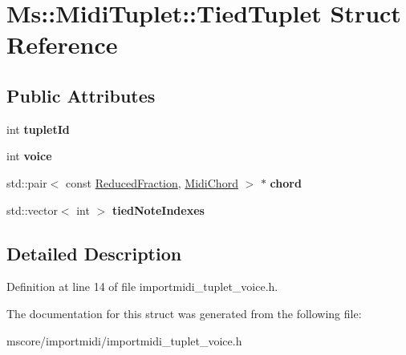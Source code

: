 \hypertarget{struct_ms_1_1_midi_tuplet_1_1_tied_tuplet}{}\section{Ms\+:\+:Midi\+Tuplet\+:\+:Tied\+Tuplet Struct Reference}
\label{struct_ms_1_1_midi_tuplet_1_1_tied_tuplet}
\subsection*{Public Attributes}
\begin{DoxyCompactItemize}
\item 
\mbox{\label{struct_ms_1_1_midi_tuplet_1_1_tied_tuplet_abdfcc145484a417a7ea349829f070813}} 
int {\bfseries tuplet\+Id}
\item 
\mbox{\label{struct_ms_1_1_midi_tuplet_1_1_tied_tuplet_af31d5fd61cf77fbbd2b1f31d57919a83}} 
int {\bfseries voice}
\item 
\mbox{\label{struct_ms_1_1_midi_tuplet_1_1_tied_tuplet_a7cc46e5c7a2b3d72b82dbd446e0d38da}} 
std\+::pair$<$ const \hyperlink{class_ms_1_1_reduced_fraction}{Reduced\+Fraction}, \hyperlink{class_ms_1_1_midi_chord}{Midi\+Chord} $>$ $\ast$ {\bfseries chord}
\item 
\mbox{\label{struct_ms_1_1_midi_tuplet_1_1_tied_tuplet_a8d2ddb9cd16fd23f5a4c1922d00041d4}} 
std\+::vector$<$ int $>$ {\bfseries tied\+Note\+Indexes}
\end{DoxyCompactItemize}


\subsection{Detailed Description}


Definition at line 14 of file importmidi\+\_\+tuplet\+\_\+voice.\+h.



The documentation for this struct was generated from the following file\+:\begin{DoxyCompactItemize}
\item 
mscore/importmidi/importmidi\+\_\+tuplet\+\_\+voice.\+h\end{DoxyCompactItemize}

